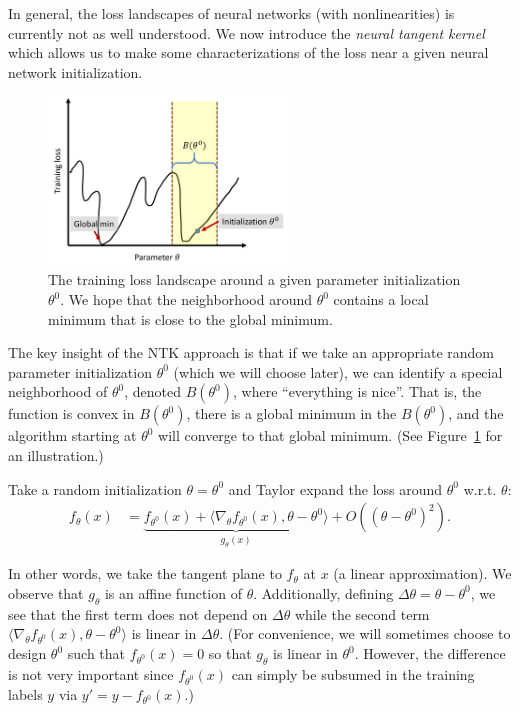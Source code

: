 

In general, the loss landscapes of neural networks (with nonlinearities) is currently not as well understood. We now introduce the \textit{neural tangent kernel} which allows us to make some characterizations of the loss near a given neural network initialization.

\begin{figure}
    \centering
    \includegraphics[width=2.5in]{figures/ntk-loss-landscape.png}
    \caption{The training loss landscape around a given parameter initialization $\theta^0$. We hope that the neighborhood around $\theta^0$ contains a local minimum that is close to the global minimum.}
    \label{lec11:fig:ntk_loss_landscape}
\end{figure}

The key insight of the NTK approach is that if we take an appropriate random parameter initialization $\theta^0$ (which we will choose later), we can identify a special neighborhood of $\theta^0$, denoted $B(\theta^0)$, where ``everything is nice''. That is, the function is convex in $B(\theta^0)$, there is a global minimum in the $B(\theta^0)$, and the algorithm starting at $\theta^0$ will converge to that global minimum. (See Figure~\ref{lec11:fig:ntk_loss_landscape} for an illustration.)

Take a random initialization $\theta = \theta^0$ and Taylor expand the loss around $\theta^0$ w.r.t. $\theta$:
\begin{align}
f_\theta(x) &= \underbrace{f_{\theta^0}(x) + \langle \nabla_\theta f_{\theta^0}(x), \theta - \theta^0 \rangle}_{g_\theta(x)} + O((\theta-\theta^0)^2).
\end{align}

In other words, we take the tangent plane to $f_\theta$ at $x$ (a linear approximation). We observe that $g_\theta$ is an affine function of $\theta$. Additionally, defining $\Delta \theta = \theta - \theta^0$, we see that the first term does not depend on $\Delta \theta$ while the second term $\langle \nabla_\theta f_{\theta^0}(x), \theta - \theta^0 \rangle$ is linear in $\Delta \theta$. (For convenience, we will sometimes choose to design $\theta^0$ such that $f_{\theta^0}(x) = 0$ so that $g_\theta$ is linear in $\theta^0$. However, the difference is not very important since $f_{\theta^0}(x)$ can simply be subsumed in the training labels $y$ via $y' = y - f_{\theta^0}(x)$.)

